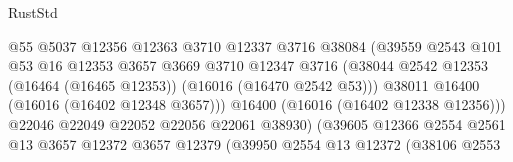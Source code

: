 \begin{lexlean}{RustStd}
\begin{coremodule}
                                            @55
                                            @5037
                                            @12356
                                            @12363
                                            @3710
                                            @12337
                                            @3716
                                            @38084
                                            (@39559
                                              @2543
                                              @101
                                              @53
                                              @16
                                              @12353
                                              @3657
                                              @3669
                                              @3710
                                              @12347
                                              @3716
                                              (@38044
                                                @2542
                                                @12353
                                                (@16464 (@16465 @12353))
                                                (@16016 (@16470 @2542 @53)))
                                              @38011
                                              @16400
                                              (@16016 (@16402 @12348 @3657)))
                                            @16400
                                            (@16016 (@16402 @12338 @12356)))
                                          @22046
                                          @22049
                                          @22052
                                          @22056
                                          @22061
                                          @38930)
                                        (@39605
                                          @12366
                                          @2554
                                          @2561
                                          @13
                                          @3657
                                          @12372
                                          @3657
                                          @12379
                                          (@39950
                                            @2554
                                            @13
                                            @12372
                                            (@38106
                                              @2553

\end{coremodule}
\end{lexlean}
